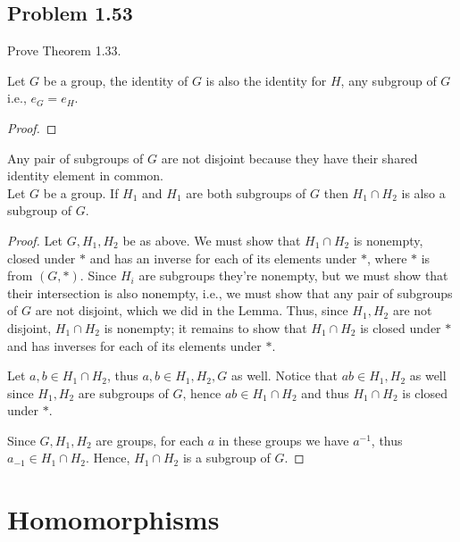 \documentclass{amsbook}
\begin{document}
			\subsection*{Problem 1.53}
			\label{sub:problem_1_53}
			Prove Theorem 1.33.

			 Let $G$ be a group, the identity of $G$ is also the identity for $H$, any subgroup of $G$ i.e., $e_{G} = e_{H}$.
			\begin{proof}
			\end{proof}		
			 Any pair of subgroups of $G$ are not disjoint because they have their shared identity element in common.\\

			 Let $G$ be a group. 
			If $H_{1}$ and $H_{1}$ are both subgroups of $G$ then $H_{1} \cap H_{2}$ is also a subgroup of $G$.
			\begin{proof} Let $G,H_{1},H_{2}$ be as above.
			We must show that $H_{1} \cap H_{2}$ is nonempty, closed under $*$ and has an inverse for each of its elements under $*$, where $*$ is from $(G,*)$.
			Since $H_{i}$ are subgroups they're nonempty, but we must show that their intersection is also nonempty, i.e., we must show that any pair of subgroups of $G$ are not disjoint, which we did in the Lemma.
			Thus, since $H_{1},H_{2}$ are not disjoint, $H_{1} \cap H_{2}$ is nonempty; it remains to show that $H_{1} \cap H_{2}$ is closed under $*$ and has inverses for each of its elements under $*$.

			Let $a,b \in H_{1} \cap H_{2}$, thus $a,b \in H_{1},H_{2},G$ as well.
			Notice that $ab \in H_{1},H_{2}$ as well since $H_{1},H_{2}$ are subgroups of $G$, hence $ab \in H_{1} \cap H_{2}$ and thus $H_{1} \cap H_{2}$ is closed under $*$.

			Since $G,H_{1},H_{2}$ are groups, for each $a$ in these groups we have $a^{-1}$, thus $a_{-1} \in H_{1} \cap H_{2}$.
			Hence, $H_{1} \cap H_{2}$ is a subgroup of $G$.
			\end{proof}

		\section{Homomorphisms}
		\label{sec:homomorphisms}
\end{document}
